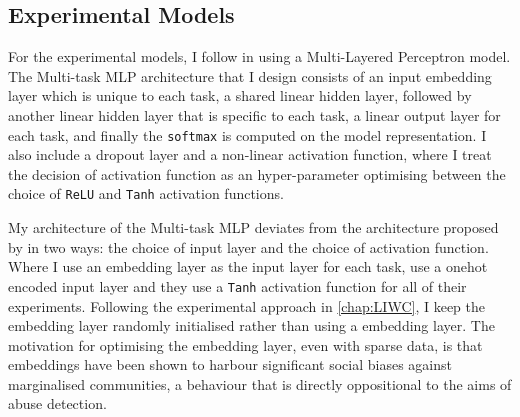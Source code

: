 \subsection{Experimental Models}
For the experimental models, I follow \citet{Waseem:2018} in using a Multi-Layered Perceptron model.
The Multi-task MLP architecture that I design consists of an input embedding layer which is unique to each task, a shared linear hidden layer, followed by another linear hidden layer that is specific to each task, a linear output layer for each task, and finally the \texttt{softmax} is computed on the model representation.
I also include a dropout layer and a non-linear activation function, where I treat the decision of activation function as an hyper-parameter optimising between the choice of \texttt{ReLU} and \texttt{Tanh} activation functions.

My architecture of the Multi-task MLP deviates from the architecture proposed by \citet{Waseem:2018} in two ways: the choice of input layer and the choice of activation function.
Where I use an embedding layer as the input layer for each task, \citet{Waseem:2018} use a onehot encoded input layer and they use a \texttt{Tanh} activation function for all of their experiments.
Following the experimental approach in \cref{chap:LIWC}, I keep the embedding layer randomly initialised rather than using a  embedding layer.
The motivation for optimising the embedding layer, even with sparse data, is that  embeddings have been shown to harbour significant social biases against marginalised communities, a behaviour that is directly oppositional to the aims of abuse detection.

